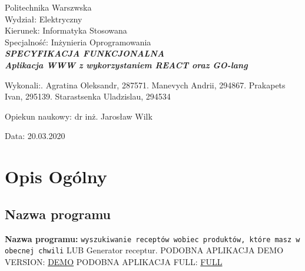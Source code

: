 \documentclass[a4paper, 12pt]{article}
\newcommand{\mainmatter}{\clearpage \cfoot{\thepage\ of \pageref{LastPage}}
\pagenumbering{arabic}}
\begin{document}
	\begin{titlepage}
		
		\begin{center}
			\Large Politechnika Warszwska\\ 
			\Large Wydział: \large Elektryczny\\
			\Large Kierunek: \large Informatyka Stosowana\\
			\Large Specjalność:	 \large Inżynieria Oprogramowania\\
    	\vspace{5cm}
    		\Large\textit{\textbf{SPECYFIKACJA FUNKCJONALNA 
    		\\Aplikacja WWW z wykorzystaniem REACT oraz GO-lang}}\\ 
		\vspace{3cm}
		\end{center} 

		\hfill\begin{minipage}{0.65\textwidth}
			\Large Wykonali:. Agratina Oleksandr, 287571. Manevych Andrii, 294867. Prakapets Ivan, 295139. Starastsenka Uladzislau, 294534
		\vspace{\baselineskip}
		\end{minipage}
		
		
		\hfill\begin{minipage}{0.65\textwidth}
			\Large Opiekun naukowy:\newline
		 		dr inż. Jarosław Wilk
		\end{minipage}
		
		\hfill\begin{minipage}{0.5\textwidth}
		\vspace{1cm}
			\Large Data: 20.03.2020
			\vspace{\baselineskip}
		\end{minipage}

	\end{titlepage}
\newpage
\mainmatter
\setlength{\headheight}{15pt}
\doublespacing
\tableofcontents
\newpage

	\section{Opis Ogólny}
		\subsection{Nazwa programu} 
			\textbf{Nazwa programu:} \texttt{wyszukiwanie receptów wobiec produktów, które masz w obecnej chwili} LUB Generator receptur.\newline
			PODOBNA APLIKACJA DEMO VERSION: \href{http://recepty-po-ingredientam.ru/}{DEMO}\newline
			PODOBNA APLIKACJA FULL: \href{https://mnevkusno.ru/}{FULL}
			
\end{document}
